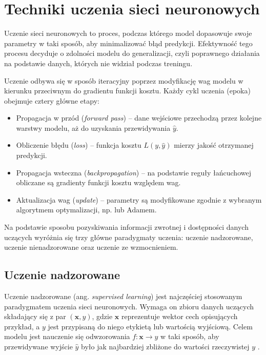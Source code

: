 \section{Techniki uczenia sieci neuronowych}
Uczenie sieci neuronowych to proces, podczas którego model dopasowuje swoje parametry w taki sposób, aby minimalizować błąd predykcji. Efektywność tego procesu decyduje o zdolności modelu do generalizacji, czyli poprawnego działania na podstawie danych, których nie widział podczas treningu.

Uczenie odbywa się w sposób iteracyjny poprzez modyfikację wag modelu w kierunku przeciwnym do gradientu funkcji kosztu. Każdy cykl uczenia (epoka) obejmuje cztery główne etapy:

\begin{itemize}
	\item Propagacja w przód (\textit{forward pass}) – dane wejściowe przechodzą przez kolejne warstwy modelu, aż do uzyskania przewidywania $\hat{y}$.
	\item Obliczenie błędu (\textit{loss}) – funkcja kosztu $𝐿(y,\hat{y})$ mierzy jakość otrzymanej predykcji. 
	\item Propagacja wsteczna (\textit{backpropagation}) – na podstawie reguły łańcuchowej obliczane są gradienty funkcji kosztu względem wag.
	\item Aktualizacja wag (\textit{update}) – parametry są modyfikowane zgodnie z wybranym algorytmem optymalizacji, np.  lub Adamem.
	
\end{itemize}

Na podstawie sposobu pozyskiwania informacji zwrotnej i dostępności danych uczących wyróżnia się trzy główne paradygmaty uczenia:
uczenie nadzorowane, uczenie nienadzorowane oraz uczenie ze wzmocnieniem.
\cite{Bishop2006}

\subsection*{Uczenie nadzorowane}

Uczenie nadzorowane (ang. \textit{supervised learning}) jest najczęściej stosowanym paradygmatem uczenia sieci neuronowych. Wymaga on zbioru danych uczących składający się z par $(\mathbf{x}, y)$, gdzie $\mathbf{x}$ reprezentuje wektor cech opisujących przykład, a $y$ jest przypisaną do niego etykietą lub wartością wyjściową. Celem modelu jest nauczenie się odwzorowania $f: \mathbf{x} \rightarrow y$ w taki sposób, aby przewidywane wyjście $\hat{y}$ było jak najbardziej zbliżone do wartości rzeczywistej $y$ \cite{Goodfellow-et-al-2016}.

